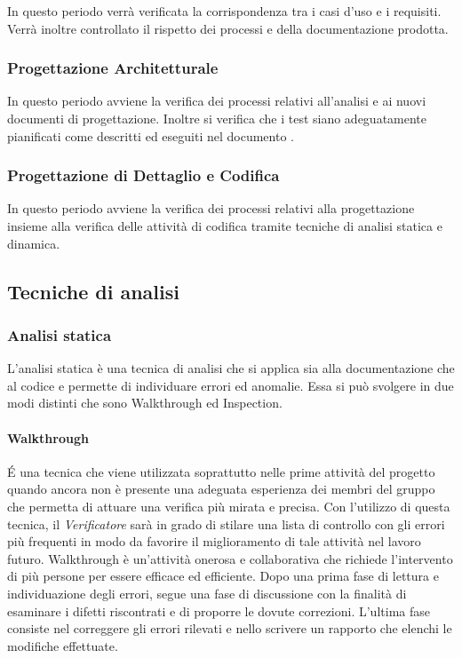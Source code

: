 In questo periodo verrà verificata la corrispondenza tra i casi d'uso
e i requisiti. Verrà inoltre controllato il rispetto dei processi e
della documentazione prodotta.

\subsubsection{Progettazione Architetturale}

In questo periodo avviene la verifica dei processi relativi all'analisi e
ai nuovi documenti di progettazione. Inoltre si verifica che i test
siano adeguatamente pianificati come descritti ed eseguiti nel documento \normediprogetto .

\subsubsection{Progettazione di Dettaglio e Codifica}

In questo periodo avviene la verifica dei processi relativi alla
progettazione insieme alla verifica delle attività di codifica tramite
tecniche di analisi statica e dinamica.



\subsection{Tecniche di analisi}

\subsubsection{Analisi statica}
L'analisi statica è una tecnica di analisi che si applica sia alla
documentazione che al codice e permette di individuare errori ed
anomalie. Essa si può svolgere in due modi distinti che sono Walkthrough ed
Inspection.

\paragraph{Walkthrough}
\'E una tecnica che viene utilizzata soprattutto nelle prime attività
del progetto quando ancora non è presente una adeguata esperienza dei
membri del gruppo che permetta di attuare una verifica più
mirata e precisa.
Con l'utilizzo di questa tecnica, il \emph{Verificatore} sarà in grado
di stilare una lista di controllo con gli errori più frequenti in modo
da favorire il miglioramento di tale attività nel lavoro futuro.
Walkthrough è un'attività onerosa e collaborativa che richiede
l'intervento di più persone per essere efficace ed efficiente. Dopo
una prima fase di lettura e individuazione degli errori, segue una
fase di discussione con la finalità di esaminare i difetti riscontrati
e di proporre le dovute correzioni. L'ultima fase consiste nel
correggere gli errori rilevati e nello scrivere un rapporto che
elenchi le modifiche effettuate.


